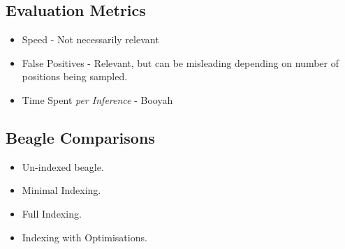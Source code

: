 \documentclass[10pt,xcolor={dvipsnames}]{beamer}
\begin{document}
\begin{NoHyper}
\subsection{Evaluation Metrics}
\begin{frame}
  \begin{itemize}
  \frametitle{Metrics for Analysing Indexing Performance}
  \item<1-> Speed - Not necessarily relevant
  \item<2-> False Positives - Relevant, but can be misleading depending on
  number of positions being sampled.
  \item<3-> Time Spent \emph{per Inference} - Booyah
  \end{itemize}
\end{frame}


\subsection{Beagle Comparisons}
\begin{frame}
  \begin{itemize}
  \frametitle{Comparing Varieties of Beagle}
  \item<1-> Un-indexed beagle.
  \item<2-> Minimal Indexing.
  \item<3-> Full Indexing.
  \item<4-> Indexing with Optimisations.
  \end{itemize}
\end{frame}


\end{NoHyper}
\end{document}
